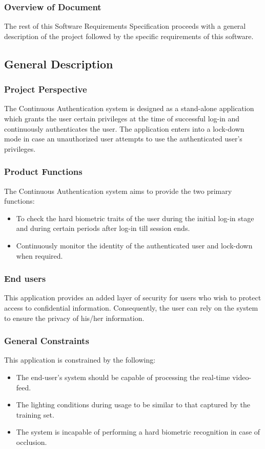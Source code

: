 \documentclass[12pt]{article}			%
\begin{document}
\subsubsection{ Overview of Document }
The rest of this Software Requirements Specification proceeds with a general description of the project followed by the specific requirements of this software. 

\subsection{ General Description }
\subsubsection{ Project Perspective }
The Continuous Authentication system is designed as a stand-alone application which grants the user certain privileges at the time of successful log-in and continuously authenticates the user. The application enters into a lock-down mode in case an unauthorized  user attempts to use the authenticated user's privileges. 

\subsubsection{ Product Functions }
The Continuous Authentication system aims to provide the two primary functions:
\begin{itemize}
	\item To check the hard biometric traits of the user during the initial log-in stage and during certain periods after log-in till session ends.
	\item Continuously monitor the identity of the authenticated user and lock-down when required.
\end{itemize}

\subsubsection{ End users }
This application provides an added layer of security for users who wish to protect access to confidential information. Consequently, the user can rely on the system to ensure the privacy of his/her information.

\subsubsection{ General Constraints }
This application is constrained by the following:
\begin{itemize}
	\item The end-user's system should be capable of processing the real-time video-feed.
	\item The lighting conditions during usage to be similar to that captured by the training set.
	\item The system is incapable of performing a hard biometric recognition in case of occlusion.
\end{itemize}
\end{document}
